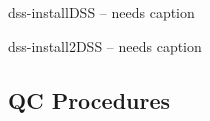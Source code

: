 \begin{cdrfigure}{dss-install}{DSS -- needs caption}
\end{cdrfigure}

\begin{cdrfigure}{dss-install2}{DSS -- needs caption}
\end{cdrfigure}

\subsection{QC Procedures}


